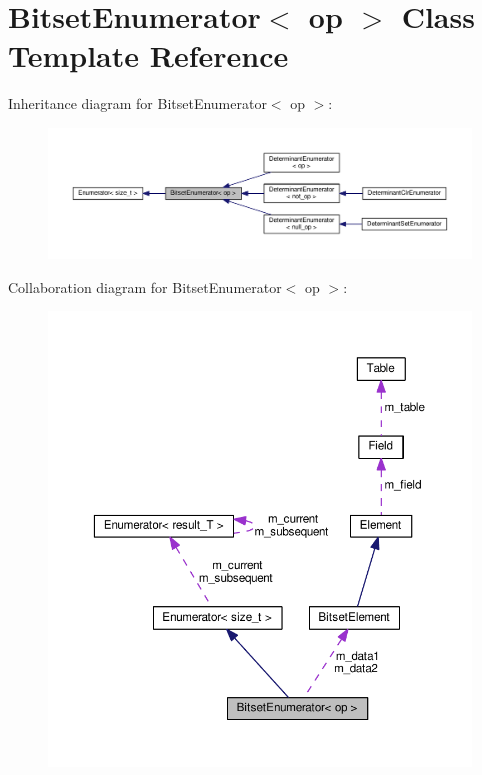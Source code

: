 \hypertarget{classBitsetEnumerator}{}\section{Bitset\+Enumerator$<$ op $>$ Class Template Reference}
\label{classBitsetEnumerator}


Inheritance diagram for Bitset\+Enumerator$<$ op $>$\+:\nopagebreak
\begin{figure}[H]
\begin{center}
\leavevmode
\includegraphics[width=350pt]{classBitsetEnumerator__inherit__graph}
\end{center}
\end{figure}


Collaboration diagram for Bitset\+Enumerator$<$ op $>$\+:\nopagebreak
\begin{figure}[H]
\begin{center}
\leavevmode
\includegraphics[width=350pt]{classBitsetEnumerator__coll__graph}
\end{center}
\end{figure}
